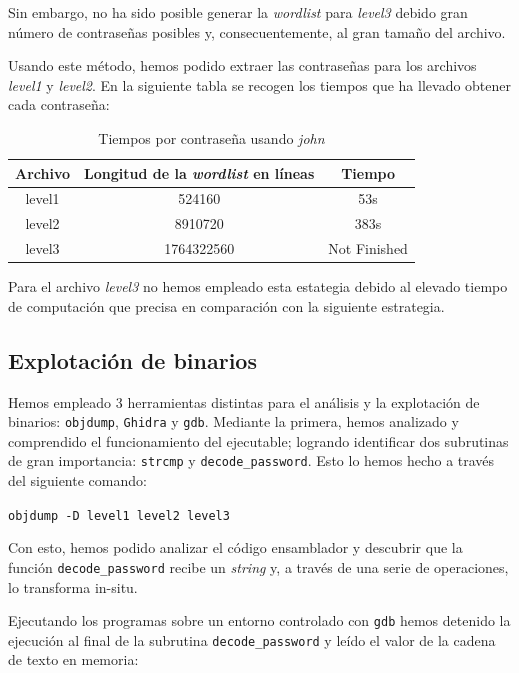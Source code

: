 \documentclass[]{article}
\begin{document}
Sin embargo, no ha sido posible generar la \textit{wordlist} para \textit{level3} debido gran número de contraseñas posibles y, consecuentemente, al gran tamaño del archivo.

Usando este método, hemos podido extraer las contraseñas para los archivos \textit{level1} y \textit{level2}. En la siguiente tabla se recogen los tiempos que ha llevado obtener cada contraseña: 
\begin{table}[H]
\begin{centering}
    \begin{tabular}{|c|c|c|}
        \hline
        Archivo & Longitud de la \textit{wordlist} en líneas & Tiempo\\
        \hline
        level1 & 524160 & 53s\\ 
        level2 & 8910720 & 383s\\
        level3 & 1764322560 & Not Finished\\
        \hline
    \end{tabular}
    \caption {\small Tiempos por contraseña usando \textit{john}}
\end{centering}
\end{table}

Para el archivo \textit{level3} no hemos empleado esta estategia debido al elevado tiempo de computación que precisa en comparación con la siguiente estrategia.

\subsection{Explotación de binarios}
\label{subsec:binary}
Hemos empleado 3 herramientas distintas para el análisis y la explotación de binarios: \texttt{objdump}, \texttt{Ghidra} y \texttt{gdb}. Mediante la primera, hemos analizado y comprendido el funcionamiento del ejecutable; logrando identificar dos subrutinas de gran importancia: \texttt{strcmp} y \texttt{decode\_password}. Esto lo hemos hecho a través del siguiente comando:

\begin{center}\texttt{objdump -D level1 level2 level3}\end{center}

Con esto, hemos podido analizar el código ensamblador y descubrir que la función \texttt{decode\_password} recibe un \textit{string} y, a través de una serie de operaciones, lo transforma in-situ.

Ejecutando los programas sobre un entorno controlado con \texttt{gdb} hemos detenido la ejecución al final de la subrutina \texttt{decode\_password} y leído el valor de la cadena de texto en memoria:
\end{document}
